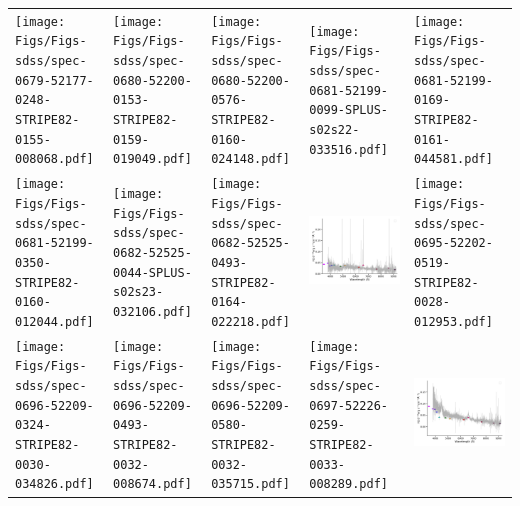 \begin{center}
\begin{longtable}{l l l l l }
    \texttt{[image: Figs/Figs-sdss/spec-0679-52177-0248-STRIPE82-0155-008068.pdf]} & \texttt{[image: Figs/Figs-sdss/spec-0680-52200-0153-STRIPE82-0159-019049.pdf]} & \texttt{[image: Figs/Figs-sdss/spec-0680-52200-0576-STRIPE82-0160-024148.pdf]} & \texttt{[image: Figs/Figs-sdss/spec-0681-52199-0099-SPLUS-s02s22-033516.pdf]} & \texttt{[image: Figs/Figs-sdss/spec-0681-52199-0169-STRIPE82-0161-044581.pdf]} \\
    \texttt{[image: Figs/Figs-sdss/spec-0681-52199-0350-STRIPE82-0160-012044.pdf]} & \texttt{[image: Figs/Figs-sdss/spec-0682-52525-0044-SPLUS-s02s23-032106.pdf]} & \texttt{[image: Figs/Figs-sdss/spec-0682-52525-0493-STRIPE82-0164-022218.pdf]} & \includegraphics[width=0.19\linewidth, clip]{Figs/Figs-sdss/spec-0685-52203-0487-STRIPE82-0002-029499.pdf} & \texttt{[image: Figs/Figs-sdss/spec-0695-52202-0519-STRIPE82-0028-012953.pdf]} \\
    \texttt{[image: Figs/Figs-sdss/spec-0696-52209-0324-STRIPE82-0030-034826.pdf]} & \texttt{[image: Figs/Figs-sdss/spec-0696-52209-0493-STRIPE82-0032-008674.pdf]} & \texttt{[image: Figs/Figs-sdss/spec-0696-52209-0580-STRIPE82-0032-035715.pdf]} & \texttt{[image: Figs/Figs-sdss/spec-0697-52226-0259-STRIPE82-0033-008289.pdf]} & \includegraphics[width=0.19\linewidth, clip]{Figs/Figs-sdss/spec-0701-52179-0153-STRIPE82-0045-050333.pdf} \\

\end{longtable}
\end{center}
